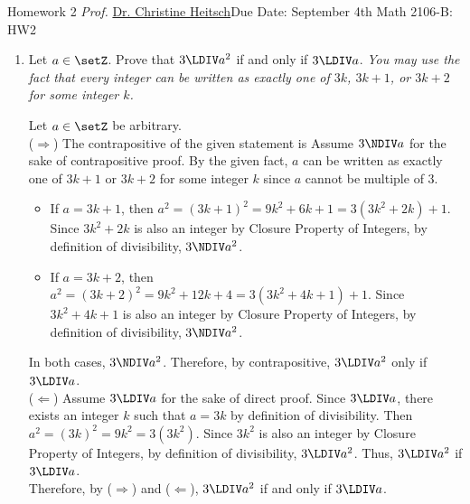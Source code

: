 \newpage{}
{Homework 2}
{\textit{Prof.} \href{https://ceheitsch.github.io/webpage/}{Dr. Christine Heitsch}}{Due Date: September 4th}
{Math 2106-B: HW2}

\newpage
\newpage
\newpage
\newpage



\begin{enumerate} 
  \item Let $a \in \setZ$. Prove that $3\LDIV a^2$ if and only if $3\LDIV a$.
  \label{prob:divisibility-by-3} %
  \textit{You may use the fact that every integer can be written as 
  exactly one of $3k$, $3k + 1$, or $3k+2$ for some integer $k$.}
  \begin{subprove}
    Let $a \in \setZ$ be arbitrary. \vspace*{10px}\\
    ($\Rightarrow$) The contrapositive of the given statement is 
    Assume $3\NDIV a$ for the sake of contrapositive proof. 
    By the given fact, $a$ can be written as exactly one of $3k + 1$ or $3k+2$ for some 
    integer $k$ since $a$ cannot be multiple of $3$.
    \begin{itemize}
      \item If $a = 3k + 1$, then $a^2 = (3k + 1)^2 = 9k^2 + 6k + 1 = 3(3k^2 + 2k) + 1$. 
      Since $3k^2 + 2k$ is also an integer by Closure Property of Integers, by definition of 
      divisibility, $3\NDIV a^2$.
      \item If $a = 3k + 2$, then $a^2 = (3k + 2)^2 = 9k^2 + 12k + 4 = 3(3k^2 + 4k + 1) + 1$. 
      Since $3k^2 + 4k + 1$ is also an integer by Closure Property of Integers, by definition of 
      divisibility, $3\NDIV a^2$.
    \end{itemize}
    In both cases, $3\NDIV a^2$.
    Therefore, by contrapositive, $3\LDIV a^2$ only if $3\LDIV a$.\vspace*{10px}\\
    ($\Leftarrow$) Assume $3\LDIV a$ for the sake of direct proof. 
    Since $3\LDIV a$, there exists an integer $k$ such that $a = 3k$ by definition of divisibility.
    Then $a^2 = (3k)^2 = 9k^2 = 3(3k^2)$.
    Since $3k^2$ is also an integer by Closure Property of Integers, by definition of divisibility, $3\LDIV a^2$.
    Thus, $3\LDIV a^2$ if $3\LDIV a$.\vspace*{10px}\\
    Therefore, by ($\Rightarrow$) and ($\Leftarrow$), $3\LDIV a^2$ if and only if $3\LDIV a$.
  \end{subprove}
  \newpage
  

\end{enumerate}
